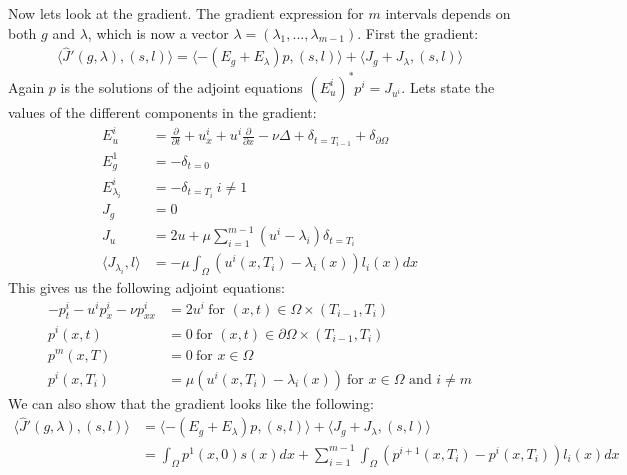 \documentclass[11pt,a4paper]{article}
\begin{document}
Now lets look at the gradient. The gradient expression for $m$ intervals depends on both $g$ and $\lambda$, which is now a vector $\lambda =(\lambda_1,...,\lambda_{m-1})$. First the gradient:
\begin{align*}
\langle \hat{J}'(g,\lambda), (s,l)\rangle =\langle -(E_g+E_{\lambda})p , (s,l)\rangle + \langle J_g+J_{\lambda}, (s,l)\rangle
\end{align*}
Again $p$ is the solutions of the adjoint equations $(E_u^i)^*p^i = J_{u^i}$. Lets state the values of the different components in the gradient: 
\begin{align*}
E_u^i&=\frac{\partial}{\partial t} + u_x^i + u^i\frac{\partial}{\partial x} - \nu\Delta + \delta_{t=T_{i-1}} + \delta_{\partial \Omega} \\
E_g^1 &= -\delta_{t=0} \\
E_{\lambda_i}^i &= -\delta_{t=T_i} \ i\neq 1 \\
J_g &= 0 \\
J_{u} &= 2u + \mu\sum_{i=1}^{m-1} (u^i - \lambda_i)\delta_{t=T_i} \\
\langle J_{\lambda_i},l\rangle &= -\mu\int_{\Omega} (u^i(x,T_i)-\lambda_i(x))l_i(x)dx
\end{align*}
This gives us the following adjoint equations:
\begin{align*}
-p_t^i -u^ip_x^i - \nu p_{xx}^i &= 2u^i \ \text{for $(x,t)\in \Omega\times(T_{i-1},T_i)$}\\
p^i(x,t) &= 0 \ \text{for $(x,t) \in\partial\Omega\times(T_{i-1},T_i)$ } \\
p^m(x,T) &= 0 \ \text{for $x \in\Omega$ } \\
p^i(x,T_i) &= \mu(u^i(x,T_i)-\lambda_i(x)) \ \text{for $x \in\Omega$ and $i\neq m$}
\end{align*}
We can also show that the gradient looks like the following:
\begin{align*}
\langle \hat{J}'(g,\lambda), (s,l)\rangle &=\langle -(E_g+E_{\lambda})p , (s,l)\rangle + \langle J_g+J_{\lambda}, (s,l)\rangle \\
&= \int_{\Omega} p^1(x,0)s(x)dx + \sum_{i=1}^{m-1}\int_{\Omega} (p^{i+1}(x,T_i)-p^i(x,T_i))l_i(x)dx
\end{align*}
\end{document}
